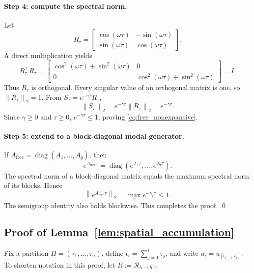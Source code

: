 \documentclass{article}
\theoremstyle{plain}
\theoremstyle{definition}
\theoremstyle{remark}
\newcommand{\Restr}{\mathcal{R}}
\newcommand{\norm}[1]{\left\lVert #1 \right\rVert}
\begin{document}
\paragraph{Step 4: compute the spectral norm.}
Let
\begin{equation}
R_{\tau}
=
\begin{bmatrix}
\cos(\omega\tau)&-\sin(\omega\tau)\\
\sin(\omega\tau)&\cos(\omega\tau)
\end{bmatrix}.
\end{equation}
A direct multiplication yields
\begin{equation}
R_{\tau}^{\top}R_{\tau}
=
\begin{bmatrix}
\cos^2(\omega\tau)+\sin^2(\omega\tau)&0\\
0&\cos^2(\omega\tau)+\sin^2(\omega\tau)
\end{bmatrix}
=I.
\end{equation}
Thus $R_{\tau}$ is orthogonal. Every singular value of an orthogonal matrix is one, so $\norm{R_{\tau}}_2=1$. From $S_{\tau}=e^{-\gamma\tau}R_{\tau}$,
\begin{equation}
\norm{S_{\tau}}_2
=e^{-\gamma\tau}\norm{R_{\tau}}_2
=e^{-\gamma\tau}.
\end{equation}
Since $\gamma\ge0$ and $\tau\ge0$, $e^{-\gamma\tau}\le1$, proving \cref{eq:free_nonexpansive}.

\paragraph{Step 5: extend to a block-diagonal modal generator.}
If $A_{\mathrm{free}}=\operatorname{diag}(A_1,\ldots,A_q)$, then
\begin{equation}
e^{A_{\mathrm{free}}\tau}
=\operatorname{diag}(e^{A_1\tau},\ldots,e^{A_q\tau}).
\end{equation}
The spectral norm of a block-diagonal matrix equals the maximum spectral norm of its blocks. Hence
\begin{equation}
\norm{e^{A_{\mathrm{free}}\tau}}_2
=\max_r e^{-\gamma_r\tau}
\le1.
\end{equation}
The semigroup identity also holds blockwise. This completes the proof. \qed

\subsection{Proof of Lemma~\ref{lem:spatial_accumulation}}
\label{app:proof_spatial}

Fix a partition $\Pi=(\tau_1,\ldots,\tau_n)$, define $t_i=\sum_{j=1}^{i}\tau_j$, and write $u_i=u_{[t_{i-1},t_i]}$. To shorten notation in this proof, let $R:=\Restr_{h\rightarrow h'}$.
\end{document}
